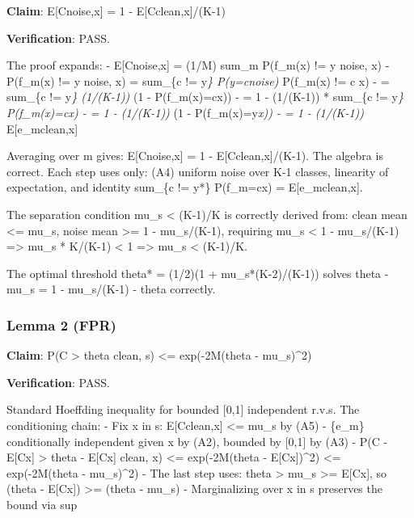 \documentclass[
  12pt,
]{article}
\begin{document}
\textbf{Claim}: E{[}C\textbar noise,x{]} = 1 -
E{[}C\textbar clean,x{]}/(K-1)

\textbf{Verification}: PASS.

The proof expands: - E{[}C\textbar noise,x{]} = (1/M) sum\_m P(f\_m(x)
!= y \textbar{} noise, x) - P(f\_m(x) != y \textbar{} noise, x) =
sum\_\{c != y\emph{\} P(y=c\textbar noise) } P(f\_m(x) != c \textbar{}
x) - = sum\_\{c != y\emph{\} (1/(K-1)) } (1 - P(f\_m(x)=c\textbar x)) -
= 1 - (1/(K-1)) * sum\_\{c != y\emph{\} P(f\_m(x)=c\textbar x) - = 1 -
(1/(K-1)) } (1 - P(f\_m(x)=y\emph{\textbar x)) - = 1 - (1/(K-1)) }
E{[}e\_m\textbar clean,x{]}

Averaging over m gives: E{[}C\textbar noise,x{]} = 1 -
E{[}C\textbar clean,x{]}/(K-1). The algebra is correct. Each step uses
only: (A4) uniform noise over K-1 classes, linearity of expectation, and
identity sum\_\{c != y*\} P(f\_m=c\textbar x) =
E{[}e\_m\textbar clean,x{]}.

The separation condition mu\_s \textless{} (K-1)/K is correctly derived
from: clean mean \textless= mu\_s, noise mean \textgreater= 1 -
mu\_s/(K-1), requiring mu\_s \textless{} 1 - mu\_s/(K-1) =\textgreater{}
mu\_s * K/(K-1) \textless{} 1 =\textgreater{} mu\_s \textless{} (K-1)/K.

The optimal threshold theta* = (1/2)(1 + mu\_s*(K-2)/(K-1)) solves theta
- mu\_s = 1 - mu\_s/(K-1) - theta correctly.

\subsubsection{Lemma 2 (FPR)}\label{lemma-2-fpr}

\textbf{Claim}: P(C \textgreater{} theta \textbar{} clean, s) \textless=
exp(-2M(theta - mu\_s)\^{}2)

\textbf{Verification}: PASS.

Standard Hoeffding inequality for bounded {[}0,1{]} independent r.v.s.
The conditioning chain: - Fix x in s: E{[}C\textbar clean,x{]}
\textless= mu\_s by (A5) - \{e\_m\} conditionally independent given x by
(A2), bounded by {[}0,1{]} by (A3) - P(C - E{[}C\textbar x{]}
\textgreater{} theta - E{[}C\textbar x{]} \textbar{} clean, x)
\textless= exp(-2M(theta - E{[}C\textbar x{]})\^{}2) \textless=
exp(-2M(theta - mu\_s)\^{}2) - The last step uses: theta \textgreater{}
mu\_s \textgreater= E{[}C\textbar x{]}, so (theta - E{[}C\textbar x{]})
\textgreater= (theta - mu\_s) - Marginalizing over x in s preserves the
bound via sup
\end{document}
